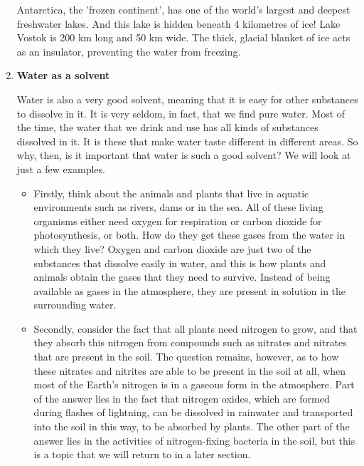 \begin{enumerate}
\begin{IFact}{Antarctica, the 'frozen continent', has one of the world's largest and deepest freshwater lakes. And this lake is hidden beneath 4 kilometres of ice! Lake Vostok is 200 km long and 50 km wide. The thick, glacial blanket of ice acts as an insulator, preventing the water from freezing.}
\end{IFact}

\item{\textbf{Water as a solvent}

Water is also a very good solvent, meaning that it is easy for other substances to dissolve in it. It is very seldom, in fact, that we find pure water. Most of the time, the water that we drink and use has all kinds of substances dissolved in it. It is these that make water taste different in different areas. So why, then, is it important that water is such a good solvent? We will look at just a few examples.\\

\begin{itemize}
\item{
Firstly, think about the animals and plants that live in aquatic environments such as rivers, dams or in the sea. All of these living organisms either need oxygen for respiration or carbon dioxide for photosynthesis, or both. How do they get these gases from the water in which they live? Oxygen and carbon dioxide are just two of the substances that dissolve easily in water, and this is how plants and animals obtain the gases that they need to survive. Instead of being available as gases in the atmosphere, they are present in solution in the surrounding water.}

\item{Secondly, consider the fact that all plants need nitrogen to grow, and that they absorb this nitrogen from compounds such as nitrates and nitrates that are present in the soil. The question remains, however, as to how these nitrates and nitrites are able to be present in the soil at all, when most of the Earth's nitrogen is in a gaseous form in the atmosphere. Part of the answer lies in the fact that nitrogen oxides, which are formed during flashes of lightning, can be dissolved in rainwater and transported into the soil in this way, to be absorbed by plants. The other part of the answer lies in the activities of nitrogen-fixing bacteria in the soil, but this is a topic that we will return to in a later section.}
\end{itemize}
}

\end{enumerate}

